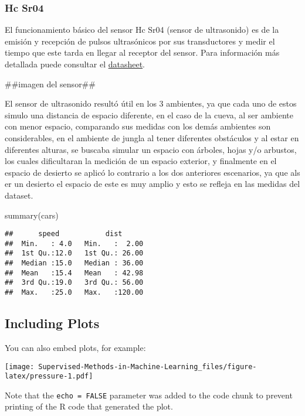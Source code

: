 \documentclass[
]{article}
\newenvironment{Shaded}{\begin{snugshade}}{\end{snugshade}}
\newcommand{\FunctionTok}[1]{\textcolor[rgb]{0.00,0.00,0.00}{#1}}
\newcommand{\NormalTok}[1]{#1}
\begin{document}
\hypertarget{hc-sr04}{%
\subsubsection{Hc Sr04}\label{hc-sr04}}

El funcionamiento básico del sensor Hc Sr04 (sensor de ultrasonido) es
de la emisión y recepción de pulsos ultrasónicos por sus transductores y
medir el tiempo que este tarda en llegar al receptor del sensor. Para
información más detallada puede consultar el
\href{chrome-extension://efaidnbmnnnibpcajpcglclefindmkaj/https://leantec.es/wp-content/uploads/2019/06/Leantec.ES-HC-SR04.pdf}{datasheet}.

\#\#imagen del sensor\#\#

El sensor de ultrasonido resultó útil en los 3 ambientes, ya que cada
uno de estos simulo una distancia de espacio diferente, en el caso de la
cueva, al ser ambiente con menor espacio, comparando sus medidas con los
demás ambientes son considerables, en el ambiente de jungla al tener
diferentes obstáculos y al estar en diferentes alturas, se buscaba
simular un espacio con árboles, hojas y/o arbustos, los cuales
dificultaran la medición de un espacio exterior, y finalmente en el
espacio de desierto se aplicó lo contrario a los dos anteriores
escenarios, ya que als er un desierto el espacio de este es muy amplio y
esto se refleja en las medidas del dataset.

\begin{Shaded}
\begin{Highlighting}[]
\FunctionTok{summary}\NormalTok{(cars)}
\end{Highlighting}
\end{Shaded}

\begin{verbatim}
##      speed           dist       
##  Min.   : 4.0   Min.   :  2.00  
##  1st Qu.:12.0   1st Qu.: 26.00  
##  Median :15.0   Median : 36.00  
##  Mean   :15.4   Mean   : 42.98  
##  3rd Qu.:19.0   3rd Qu.: 56.00  
##  Max.   :25.0   Max.   :120.00
\end{verbatim}

\hypertarget{including-plots}{%
\subsection{Including Plots}\label{including-plots}}

You can also embed plots, for example:

\texttt{[image: Supervised-Methods-in-Machine-Learning\_files/figure-latex/pressure-1.pdf]}

Note that the \texttt{echo\ =\ FALSE} parameter was added to the code
chunk to prevent printing of the R code that generated the plot.
\end{document}
